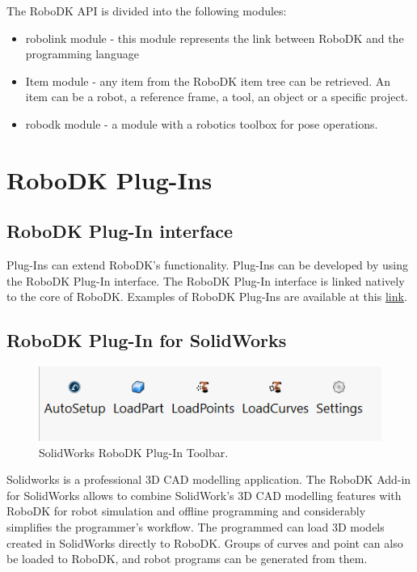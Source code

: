 The RoboDK API is divided into the following modules:


\begin{itemize}
    \item robolink module - this module represents the link between RoboDK and the programming language
    \item Item module - any item from the RoboDK item tree can be retrieved.  An item can be a robot, a reference frame, a tool, an object or a specific project.
    \item robodk module - a module with a robotics toolbox for pose operations.
\end{itemize}

\section{RoboDK Plug-Ins}

\subsection{RoboDK Plug-In interface}

Plug-Ins can extend RoboDK's functionality. Plug-Ins can be developed by using the RoboDK Plug-In interface. The RoboDK Plug-In interface is linked natively to the core of RoboDK. Examples of RoboDK Plug-Ins are available at this \href{https://github.com/RoboDK/Plug-In-Interface}{link}. 

\subsection{RoboDK Plug-In for SolidWorks}

\begin{figure}[h]
    \centering
    \includegraphics[width=0.6\linewidth]{img/solidworks_toolbar.PNG}
    \caption{SolidWorks RoboDK Plug-In Toolbar.}
    \label{fig:solidworkstoolbar}
\end{figure}


Solidworks is a professional 3D CAD modelling application. The RoboDK Add-in for SolidWorks allows to combine SolidWork's 3D CAD modelling features with RoboDK for robot simulation and offline programming and considerably simplifies the programmer's workflow. The programmed can load 3D models created in SolidWorks directly to RoboDK. Groups of curves and point can also be loaded to RoboDK, and robot programs can be generated from them.

